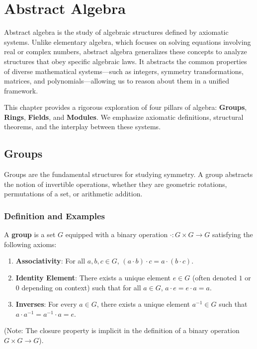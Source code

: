 \chapter{Abstract Algebra}

Abstract algebra is the study of algebraic structures defined by axiomatic systems. Unlike elementary algebra, which focuses on solving equations involving real or complex numbers, abstract algebra generalizes these concepts to analyze structures that obey specific algebraic laws. It abstracts the common properties of diverse mathematical systems—such as integers, symmetry transformations, matrices, and polynomials—allowing us to reason about them in a unified framework. 

This chapter provides a rigorous exploration of four pillars of algebra: \textbf{Groups}, \textbf{Rings}, \textbf{Fields}, and \textbf{Modules}. We emphasize axiomatic definitions, structural theorems, and the interplay between these systems.

\section{Groups}

Groups are the fundamental structures for studying symmetry. A group abstracts the notion of invertible operations, whether they are geometric rotations, permutations of a set, or arithmetic addition.

\subsection{Definition and Examples}

\begin{definition}[Group]
A \textbf{group} is a set $G$ equipped with a binary operation $\cdot: G \times G \to G$ satisfying the following axioms:
\begin{enumerate}
    \item \textbf{Associativity}: For all $a, b, c \in G$, $(a \cdot b) \cdot c = a \cdot (b \cdot c)$.
    \item \textbf{Identity Element}: There exists a unique element $e \in G$ (often denoted $1$ or $0$ depending on context) such that for all $a \in G$, $a \cdot e = e \cdot a = a$.
    \item \textbf{Inverses}: For every $a \in G$, there exists a unique element $a^{-1} \in G$ such that $a \cdot a^{-1} = a^{-1} \cdot a = e$.
\end{enumerate}
(Note: The closure property is implicit in the definition of a binary operation $G \times G \to G$).
\end{definition}

